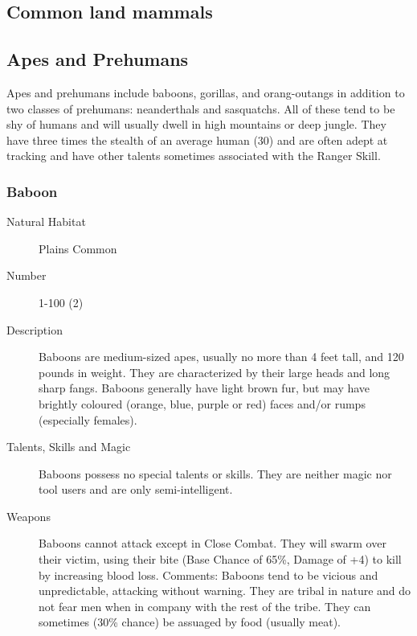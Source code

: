 \begin{multicols*}{2}

\setlength\columnseprule{0.2mm}

\section{Common land mammals}

\subsection{Apes and Prehumans}
Apes and prehumans include baboons, gorillas, and orang-outangs in
addition to two classes of prehumans: neanderthals and sasquatchs. All
of these tend to be shy of humans and will usually dwell in high
mountains or deep jungle.  They have three times the stealth of an
average human (30) and are often adept at tracking and have other
talents sometimes associated with the Ranger Skill.

\subsubsection{Baboon}

\begin{description}
\item[Natural Habitat] Plains Common

\item[Number] 1-100 (2)

\item[Description] Baboons are medium-sized apes, usually no more than 4
feet tall, and 120 pounds in weight. They are characterized by their
large heads and long sharp fangs.  Baboons generally have light brown
fur, but may have brightly coloured (orange, blue, purple or red)
faces and/or rumps (especially females).

\item[Talents, Skills and Magic] Baboons possess no special talents or skills. They are
neither magic nor tool users and are only semi-intelligent.

\item[Weapons] Baboons cannot attack except in Close Combat.  They will
swarm over their victim, using their bite (Base Chance of 65\%,
Damage of +4) to kill by increasing blood loss.  Comments: Baboons
tend to be vicious and unpredictable, attacking without warning. They
are tribal in nature and do not fear men when in company with the rest
of the tribe.  They can sometimes (30\% chance) be assuaged by
food (usually meat).



\end{description}
\end{multicols*}
